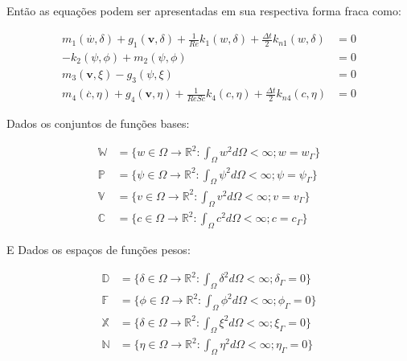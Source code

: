 \noindent
Então as equações podem ser apresentadas em sua respectiva forma fraca como:

\begin{align}
 \textbf{$m_1$}(\overset{.}{w},\delta) + \textbf{$g_1$}(\textbf{v},\delta) 
 + \frac{1}{\textit{Re}}\textbf{$k_1$}(w,\delta) + \frac{\Delta t}{2} \textbf{$k_{n1}$}(w,\delta) &= 0 \\
 -\textbf{$k_2$}(\psi,\phi) + \textbf{$m_2$}(\psi,\phi) &= 0 \\
  \textbf{$m_3$}(\textbf{v},\xi) - \textbf{$g_3$}(\psi,\xi) &= 0 \\
 \textbf{$m_4$}(\overset{.}{c},\eta) + \textbf{$g_4$}(\textbf{v},\eta) 
 + \frac{1}{\textit{ReSc}}\textbf{$k_4$}(c,\eta) +\frac{\Delta t}{2} \textbf{$k_{n4}$}(c,\eta) &= 0
\end{align}


\noindent
Dados os conjuntos de funções bases:

\begin{equation}
 \begin{aligned}
  \mathbb{W} &= \{w \in \Omega \rightarrow \mathbb{R}^2
  : \int_\Omega w^2 d\Omega < \infty 
  ; w = w_\Gamma\} \\
  \mathbb{P} &= \{\psi \in \Omega \rightarrow \mathbb{R}^2
  : \int_\Omega \psi^2 d\Omega < \infty 
  ; \psi = \psi_\Gamma\} \\
  \mathbb{V} &= \{v \in \Omega \rightarrow \mathbb{R}^2
  : \int_\Omega v^2 d\Omega < \infty 
  ; v = v_\Gamma\} \\
  \mathbb{C} &= \{c \in \Omega \rightarrow \mathbb{R}^2
  : \int_\Omega c^2 d\Omega < \infty 
  ; c = c_\Gamma\}
 \end{aligned}
\end{equation}

\noindent
E Dados os espaços de funções pesos:

\begin{equation}
 \begin{aligned}
  \mathbb{D} &= \{\delta \in \Omega \rightarrow \mathbb{R}^2
  : \int_\Omega \delta^2 d\Omega < \infty
  ; \delta_\Gamma = 0\} \\
  \mathbb{F} &= \{\phi \in \Omega \rightarrow \mathbb{R}^2
  : \int_\Omega \phi^2 d\Omega < \infty 
  ; \phi_\Gamma = 0\} \\
  \mathbb{X} &= \{\delta \in \Omega \rightarrow \mathbb{R}^2
  : \int_\Omega \xi^2 d\Omega < \infty 
  ; \xi_\Gamma = 0\} \\
  \mathbb{N} &= \{\eta \in \Omega \rightarrow \mathbb{R}^2
  : \int_\Omega \eta^2 d\Omega < \infty 
  ; \eta_\Gamma = 0\}
 \end{aligned}
\end{equation}

